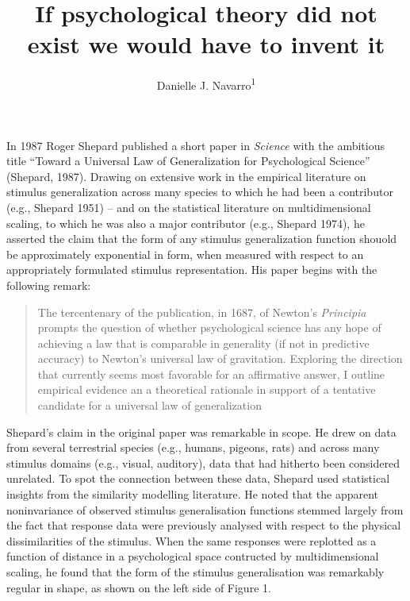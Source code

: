 \documentclass[doc]{apa6}
\affiliation{
\vspace{0.5cm}
\textsuperscript{1} School of Psychology, University of New South Wales}
\title{If psychological theory did not exist we would have to invent it}
\author{Danielle J. Navarro\textsuperscript{1}}
\date{}
\begin{document}
\maketitle

In 1987 Roger Shepard published a short paper in \emph{Science} with the ambitious title \enquote{Toward a Universal Law of Generalization for Psychological Science} (Shepard, 1987). Drawing on extensive work in the empirical literature on stimulus generalization across many species to which he had been a contributor (e.g., Shepard 1951) -- and on the statistical literature on multidimensional scaling, to which he was also a major contributor (e.g., Shepard 1974), he asserted the claim that the form of any stimulus generalization function shouold be approximately exponential in form, when measured with respect to an appropriately formulated stimulus representation. His paper begins with the following remark:

\begin{quote}
The tercentenary of the publication, in 1687, of Newton's \emph{Principia} prompts the question of whether psychological science has any hope of achieving a law that is comparable in generality (if not in predictive accuracy) to Newton's universal law of gravitation. Exploring the direction that currently seems most favorable for an affirmative answer, I outline empirical evidence an a theoretical rationale in support of a tentative candidate for a universal law of generalization
\end{quote}

Shepard's claim in the original paper was remarkable in scope. He drew on data from several terrestrial species (e.g., humans, pigeons, rats) and across many stimulus domains (e.g., visual, auditory), data that had hitherto been considered unrelated. To spot the connection between these data, Shepard used statistical insights from the similarity modelling literature. He noted that the apparent noninvariance of observed stimulus generalisation functions stemmed largely from the fact that response data were previously analysed with respect to the physical dissimilarities of the stimulus. When the same responses were replotted as a function of distance in a psychological space contructed by multidimensional scaling, he found that the form of the stimulus generalisation was remarkably regular in shape, as shown on the left side of Figure 1.
\end{document}
